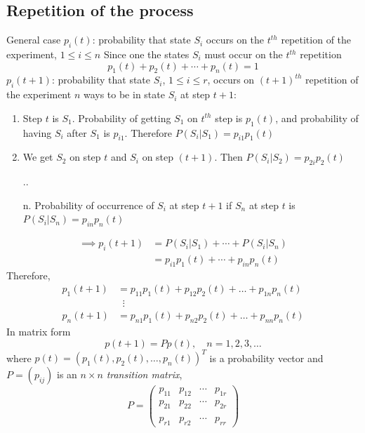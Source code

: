 \documentclass[aspectratio=169]{beamer}
\begin{document}
\subsection{Repetition of the process}
\begin{frame}{General case}
$p_i(t)$: probability that state $S_i$ occurs on the $t^{th}$ repetition of the experiment, $1\leq i\leq n$
\vfill
Since one the states $S_i$ must occur on the $t^{th}$ repetition
\[
p_1(t)+p_2(t)+\cdots+p_n(t)=1
\]
$p_i(t+1)$: probability that state $S_i$, $1\leq i\leq r$, occurs on $(t+1)^{th}$ repetition of the experiment
\vfill
$n$ ways to be in state $S_i$ at step $t+1$:
\begin{enumerate}
\item Step $t$ is $S_1$. Probability of getting $S_1$ on $t^{th}$ step is $p_1(t)$, and probability of having $S_i$ after $S_1$ is $p_{i1}$. Therefore $P(S_i|S_1)=p_{i1}p_1(t)$
\item We get $S_2$ on step $t$ and $S_i$ on step $(t+1)$. Then $P(S_i|S_2)=p_{2i}p_2(t)$
\item[..]
\item[n.] Probability of occurrence of $S_i$ at step $t+1$ if $S_n$ at step $t$ is $P(S_i|S_n)=p_{in}p_n(t)$
\end{enumerate}
\end{frame}


\begin{frame}
\begin{align*}
\implies
p_i(t+1) &= P(S_i|S_1)+\cdots+P(S_i|S_n) \\
&= p_{i1}p_1(t)+\cdots+p_{in}p_n(t)
\end{align*}
Therefore,
\begin{align*}
p_1(t+1) &= p_{11}p_1(t)+p_{12}p_2(t)+\dots+p_{1n}p_n(t) \\
& \;\;\vdots\\
p_n(t+1) &= p_{n1}p_1(t)+p_{n2}p_2(t)+\dots+p_{nn}p_n(t)
\end{align*}
\vfill
In matrix form
\[
p(t+1)=Pp(t), \quad n=1,2,3,\dots
\]
where $p(t)=(p_1(t),p_{2}(t),\dots , p_n(t))^T$ is a probability vector and $P=(p_{ij})$ is an $n\times n$ \emph{transition matrix},
\[
P=
\begin{pmatrix}
p_{11} & p_{12} & \cdots & p_{1r} \\
p_{21} & p_{22} & \cdots & p_{2r} \\
&&& \\
p_{r1} & p_{r2} & \cdots & p_{rr}
\end{pmatrix}
\]
\end{frame}
\end{document}
